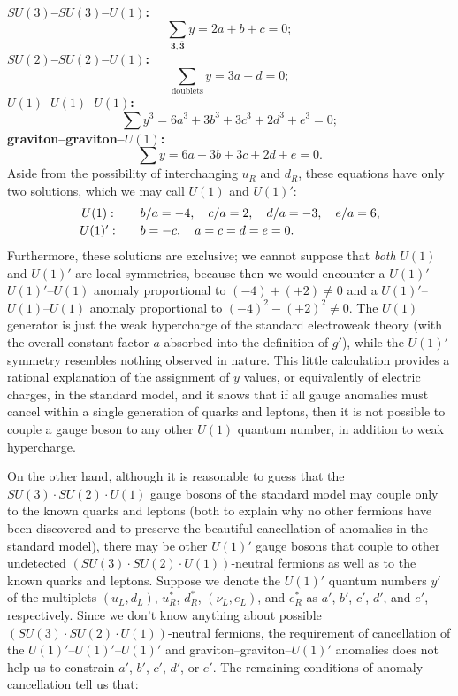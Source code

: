 \noindent\textbf{\boldmath$SU(3)$--$SU(3)$--$U(1)$:}
\[
 \sum_{\mathbf3,\overline{\mathbf3}}y=2a+b+c=0;
\]
\noindent\textbf{\boldmath$SU(2)$--$SU(2)$--$U(1)$:}
\[
 \sum_{\text{doublets}}y=3a+d=0;
\]
\noindent\textbf{\boldmath$U(1)$--$U(1)$--$U(1)$:}
\[
 \sum y^3=6a^3+3b^3+3c^3+2d^3+e^3=0;
\]
\noindent\textbf{graviton--graviton--\boldmath$U(1)$:}
\[
 \sum y=6a+3b+3c+2d+e=0.
\]
Aside from the possibility of interchanging $u_R$ and $d_R$, these
equations have only two solutions, which we may call $U(1)$ and $U(1)'$:
\[
 \begin{array}{c@{\qquad}l}
 U(1):&
 b/a=-4,\quad c/a=2,\quad d/a=-3,\quad e/a=6,\\[2pt]
 U(1)':&
 b=-c,\quad a=c=d=e=0.
 \end{array}
\]
Furthermore, these solutions are exclusive; we cannot suppose that
\emph{both} $U(1)$ and $U(1)'$ are local symmetries, because then we would
encounter a $U(1)'$--$U(1)'$--$U(1)$ anomaly proportional to
$(-4)+(+2)\neq0$ and a $U(1)'$--$U(1)$--$U(1)$ anomaly proportional to
$(-4)^2-(+2)^2\neq0$. The $U(1)$ generator is just the weak hypercharge of
the standard electroweak theory (with the overall constant factor $a$
absorbed into the definition of $g'$), while the $U(1)'$ symmetry resembles
nothing observed in nature. This little calculation provides a rational
explanation of the assignment of $y$ values, or equivalently of electric
charges, in the standard model, and it shows that if all gauge anomalies
must cancel within a single generation of quarks and leptons, then it is
not possible to couple a gauge boson to any other $U(1)$ quantum number,
in addition to weak hypercharge.

On the other hand, although it is reasonable to guess that the
$SU(3)\cdot SU(2)\cdot U(1)$ gauge bosons of the standard model may couple
only to the known quarks and leptons (both to explain why no other fermions
have been discovered and to preserve the beautiful cancellation of
anomalies in the standard model), there may be other $U(1)'$ gauge bosons
that couple to other undetected $(SU(3)\cdot SU(2)\cdot U(1))$-neutral
fermions as well as to the known quarks and leptons. Suppose we denote the
$U(1)'$ quantum numbers $y'$ of the multiplets $(u_L,d_L)$, $u_R^*$,
$d_R^*$, $(\nu_L,e_L)$, and $e_R^*$ as $a'$, $b'$, $c'$, $d'$, and $e'$,
respectively. Since we don't know anything about possible
$(SU(3)\cdot SU(2)\cdot U(1))$-neutral fermions, the requirement of
cancellation of the $U(1)'$--$U(1)'$--$U(1)'$ and
graviton--graviton--$U(1)'$ anomalies does not help us to constrain $a'$,
$b'$, $c'$, $d'$, or $e'$. The remaining conditions of anomaly
cancellation tell us that:

